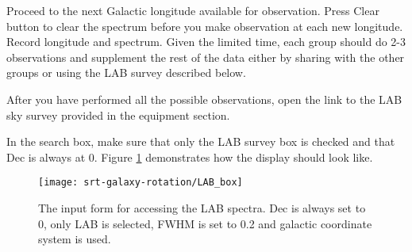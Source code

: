 \begin{steps}
	\item Proceed to the next Galactic longitude available for observation. Press Clear button to clear the spectrum before you make observation at
	each new longitude. Record longitude and spectrum. Given the limited time, each group should do 2-3 observations and supplement the rest of the data either by sharing with the other groups or using the LAB survey described below.%
	
	\item After you have performed all the possible observations, open the link to the LAB sky survey provided in the equipment section. 
	
	\item In the search box, make sure that only the LAB survey box is checked and that Dec is always at 0. Figure \ref{sgr:fig:lab-box} demonstrates how the display should look like.
\end{steps}

\begin{figure}
	\centering
	\texttt{[image: srt-galaxy-rotation/LAB\_box]}
	\caption{The input form for accessing the LAB spectra. Dec is always set to 0, only LAB is selected, FWHM is set to 0.2 and galactic coordinate system is used.} 
	\label{sgr:fig:lab-box}
\end{figure}


